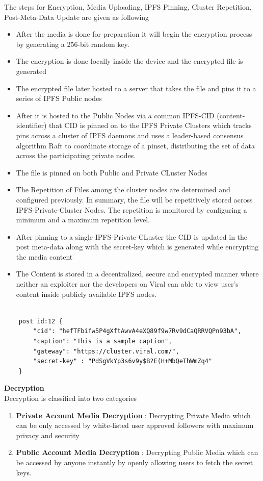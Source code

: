 \documentclass[10pt]{article}
\begin{document}
The steps for Encryption, Media Uploading, IPFS Pinning, Cluster Repetition, Post-Meta-Data Update are given as following
\begin{itemize}[leftmargin=+0.2in]
\item After the media is done for preparation it will begin the encryption process by generating a 256-bit random key.
\item The encryption is done locally inside the device and the encrypted file is generated
\item The encrypted file later hosted to a server that takes the file and pins it to a series of IPFS Public nodes
\item After it is hosted to the Public Nodes via a common IPFS-CID (content-identifier) that CID is pinned on to the IPFS Private Clusters which tracks pins across a cluster of IPFS daemons and uses a leader-based consensus algorithm Raft to coordinate storage of a pinset, distributing the set of data across the participating private nodes.
\item The file is pinned on both Public and Private CLuster Nodes
\item The Repetition of Files among the cluster nodes are determined and configured previously. In summary, the file will be repetitively stored across IPFS-Private-Cluster Nodes. The repetition is monitored by configuring a minimum and a maximum repetition level.
\item After pinning to a single IPFS-Private-CLuster the CID is updated in the post meta-data along with the secret-key which is generated while encrypting the media content
\item The Content is stored in a decentralized, secure and encrypted manner where neither an exploiter nor the developers on Viral can able to view user's content inside publicly available IPFS nodes.
\end{itemize}

\begin{lstlisting}[caption={Post Meta-Data}, numbers=none]

	post id:12 {
    	"cid": "hefTFbifw5P4gXftAwvA4eXQ89f9w7Rv9dCaQRRVQPn93bA",
   		"caption": "This is a sample caption",
    	"gateway": "https://cluster.viral.com/",
    	"secret-key" : "PdSgVkYp3s6v9y$B?E(H+MbQeThWmZq4"
	}
\end{lstlisting}

\textbf{Decryption}\\

Decryption is classified into two categories
\begin{enumerate}[leftmargin=+0.2in]
\item \textbf{Private Account Media Decryption} : Decrypting Private Media which can be only accessed by white-listed user approved followers with maximum privacy and security
\item \textbf{Public Account Media Decryption} : Decrypting Public Media which can be accessed by anyone instantly by openly allowing users to fetch the secret keys.
\end{enumerate}
\end{document}
